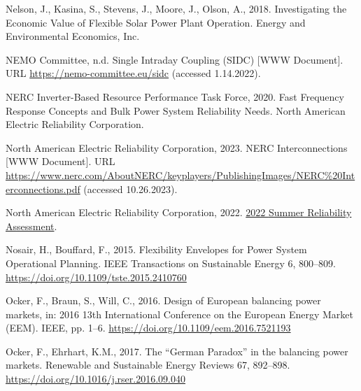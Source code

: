 \documentclass[12pt,a4paper,]{report}
\newlength{\cslhangindent}
\newenvironment{CSLReferences}[2] %
 {%
  \setlength{\parindent}{0pt}
  \ifodd #1 \everypar{\setlength{\hangindent}{\cslhangindent}}\ignorespaces\fi
  \ifnum #2 > 0
  \setlength{\parskip}{#2\baselineskip}
  \fi
 }%
 {}
\begin{document}
\begin{CSLReferences}{1}{0}
\leavevmode{}%
Nelson, J., Kasina, S., Stevens, J., Moore, J., Olson, A., 2018.
Investigating the {Economic Value} of {Flexible Solar Power Plant
Operation}. {Energy and Environmental Economics, Inc.}

\leavevmode{}%
NEMO Committee, n.d. Single Intraday Coupling (SIDC) {[}WWW Document{]}.
URL \url{https://nemo-committee.eu/sidc} (accessed 1.14.2022).

\leavevmode{}%
NERC Inverter-Based Resource Performance Task Force, 2020. Fast
{Frequency Response Concepts} and {Bulk Power System Reliability Needs}.
North American Electric Reliability Corporation.

\leavevmode{}%
North American Electric Reliability Corporation, 2023. {NERC
Interconnections} {[}WWW Document{]}. URL
\url{https://www.nerc.com/AboutNERC/keyplayers/PublishingImages/NERC\%20Interconnections.pdf}
(accessed 10.26.2023).

\leavevmode{}%
North American Electric Reliability Corporation, 2022.
\href{https://www.nerc.com/pa/RAPA/ra/Reliability\%20Assessments\%20DL/NERC_SRA_2022.pdf}{2022
{Summer Reliability Assessment}}.

\leavevmode{}%
Nosair, H., Bouffard, F., 2015. Flexibility {Envelopes} for {Power
System Operational Planning}. IEEE Transactions on Sustainable Energy 6,
800--809. \url{https://doi.org/10.1109/tste.2015.2410760}

\leavevmode{}%
Ocker, F., Braun, S., Will, C., 2016. Design of {European} balancing
power markets, in: 2016 13th {International Conference} on the {European
Energy Market} ({EEM}). IEEE, pp. 1--6.
\url{https://doi.org/10.1109/eem.2016.7521193}

\leavevmode{}%
Ocker, F., Ehrhart, K.M., 2017. The {``{German Paradox}''} in the
balancing power markets. Renewable and Sustainable Energy Reviews 67,
892--898. \url{https://doi.org/10.1016/j.rser.2016.09.040}


\end{CSLReferences}
\end{document}
